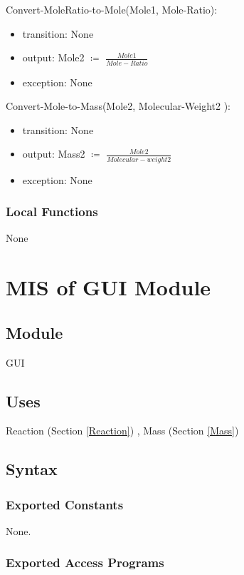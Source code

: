 \documentclass[12pt, titlepage]{article}
\begin{document}
\noindent Convert-MoleRatio-to-Mole(Mole1, Mole-Ratio):
\begin{itemize}
\item transition: None
\item output:  Mole2 $\coloneqq$ $\frac{Mole1}{Mole-Ratio}$
\item exception: None 
\end{itemize}

\noindent Convert-Mole-to-Mass(Mole2, Molecular-Weight2 ):
\begin{itemize}
\item transition: None
\item output:  Mass2 $\coloneqq$ $\frac{Mole2}{Molecular-weight2}$
\item exception: None 
\end{itemize}

\subsubsection{Local Functions}
None

\newpage

\section{MIS of GUI Module} \label{display} 

\subsection{Module}

GUI

\subsection{Uses}

Reaction (Section \ref{Reaction}) , Mass (Section \ref{Mass})


\subsection{Syntax}

\subsubsection{Exported Constants}

None.

\subsubsection{Exported Access Programs}
\end{document}
